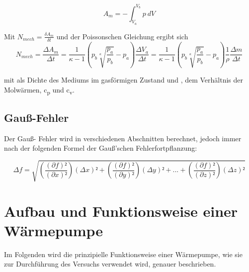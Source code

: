 \documentclass[titlepage=firstcover, captions=tableheading]{scrartcl}
\begin{document}
\begin{displaymath}
    A_m = -\int_{V_a}^{V_b} p \: dV
\end{displaymath} 

\noindent Mit $ N_{mech} = \frac{\delta A_m}{\delta t} $ und der Poissonschen Gleichung ergibt sich
\begin{equation} \label{kompressorleistung}
    N_{mech} =\frac{\Delta A_m}{\Delta t} 
    = \frac{1}{\kappa -1} \left(p_b\sqrt[\kappa]{\frac{p_a}{p_b}}-p_a\right) \frac{\Delta V_a}{\Delta t}
    = \frac{1}{\kappa -1} \left(p_b\sqrt[\kappa]{\frac{p_a}{p_b}}-p_a\right) \frac{1}{\rho} \frac{\Delta m}{\Delta t}
\end{equation}

\noindent mit \rho \: als Dichte des Mediums im gasförmigen Zustand und \kappa , dem Verhältnis der Molwärmen, c\textsubscript{p} und c\textsubscript{v}.

\subsection{Gauß-Fehler}

Der Gauß- Fehler wird in verschiedenen Abschnitten berechnet, jedoch immer nach der folgenden Formel der Gauß'schen Fehlerfortpflanzung:

\begin{equation} \label{4}
    \Delta f = \sqrt{\left(\frac{(\partial f)²}{(\partial x)²}\right) (\Delta x)² +
                     \left(\frac{(\partial f)²}{(\partial y)²}\right) (\Delta y)² + ... +
                     \left(\frac{(\partial f)²}{(\partial z)²}\right) (\Delta z)²
    }
\end{equation}

\section{Aufbau und Funktionsweise einer Wärmepumpe}

Im Folgenden wird die prinzipielle Funktionsweise einer Wärmepumpe, wie sie zur Durchführung des Versuchs verwendet wird, genauer beschrieben. 
\end{document}
